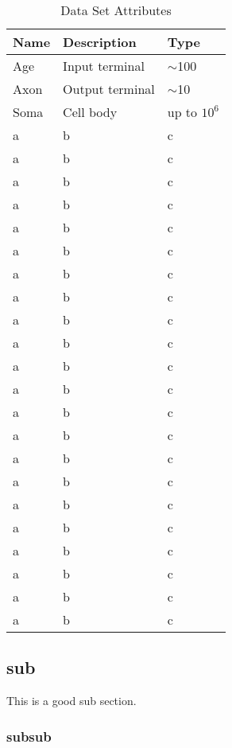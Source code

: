 \documentclass{article}
\begin{document}
\begin{table}
  \caption{Data Set Attributes}
  \label{attributes}
  \centering
  \begin{tabular}{lll}
    \toprule
    Name     & Description     & Type \\
    \midrule
    Age & Input terminal  & $\sim$100     \\
    Axon     & Output terminal & $\sim$10      \\
    Soma     & Cell body       & up to $10^6$  \\
    a     & b & c      \\
    a     & b & c      \\
    a     & b & c      \\
    a     & b & c      \\
    a     & b & c      \\
    a     & b & c      \\
    a     & b & c      \\
    a     & b & c      \\
    a     & b & c      \\
    a     & b & c      \\
    a     & b & c      \\
    a     & b & c      \\
    a     & b & c      \\
    a     & b & c      \\
    a     & b & c      \\
    a     & b & c      \\
    a     & b & c      \\
    a     & b & c      \\
    a     & b & c      \\
    a     & b & c      \\
    a     & b & c      \\
    a     & b & c      \\
    \bottomrule
  \end{tabular}
\end{table}

\subsection{sub}

This is a good sub section.

\subsubsection{subsub}
\end{document}
